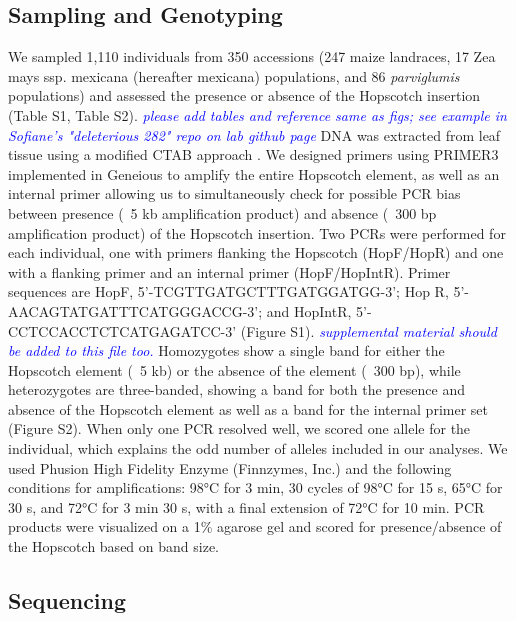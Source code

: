 \documentclass[12pt]{article}
\newcommand{\jri}[1]{\textcolor{blue}{ \emph{\scriptsize  #1}} }
\begin{document}
\subsection*{Sampling and Genotyping}

We sampled 1,110 individuals from 350 accessions (247 maize landraces, 17 Zea mays ssp. mexicana (hereafter mexicana) populations, and 86 \emph{parviglumis} populations) and assessed the presence or absence of the Hopscotch insertion (Table S1, Table S2). \jri{please add tables and reference same as figs; see example in Sofiane's "deleterious 282" repo on lab github page} DNA was extracted from leaf tissue using a modified CTAB approach \cite{Doyle and Doyle 1990, Maloof et al 1984}. We designed primers using PRIMER3 \cite{Rozen and Skaletsky 2000} implemented in Geneious \cite{Kearse et al 2012} to amplify the entire Hopscotch element, as well as an internal primer allowing us to simultaneously check for possible PCR bias between presence (~5 kb amplification product) and absence (~300 bp amplification product) of the Hopscotch insertion. Two PCRs were performed for each individual, one with primers flanking the Hopscotch (HopF/HopR) and one with a flanking primer and an internal primer (HopF/HopIntR). Primer sequences are HopF, 5'-TCGTTGATGCTTTGATGGATGG-3'; 
Hop R, 5'-AACAGTATGATTTCATGGGACCG-3'; and HopIntR, 5'-CCTCCACCTCTCATGAGATCC-3' (Figure S1). \jri{supplemental material should be added to this file too.} Homozygotes show a single band for either the Hopscotch element (~5 kb) or the absence of the element (~300 bp), while heterozygotes are three-banded, showing a band for both the presence and absence of the Hopscotch element as well as a band for the internal primer set (Figure S2). When only one PCR resolved well, we scored one allele for the individual, which explains the odd number of alleles included in our analyses. We used Phusion High Fidelity Enzyme (Finnzymes, Inc.) and the following conditions for amplifications: 98°C for 3 min, 30 cycles of 98°C for 15 s, 65°C for 30 s, and 72°C for 3 min 30 s, with a final extension of 72°C for 10 min. PCR products were visualized on a 1\% agarose gel and scored for presence/absence of the Hopscotch based on band size.

\subsection*{Sequencing}
\end{document}
